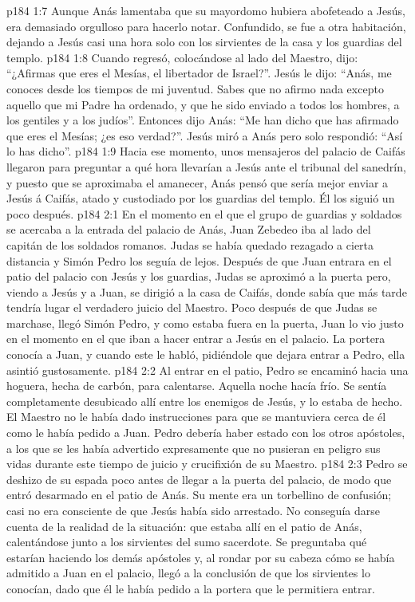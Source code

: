 \vs p184 1:7 Aunque Anás lamentaba que su mayordomo hubiera abofeteado a Jesús, era demasiado orgulloso para hacerlo notar. Confundido, se fue a otra habitación, dejando a Jesús casi una hora solo con los sirvientes de la casa y los guardias del templo.
\vs p184 1:8 Cuando regresó, colocándose al lado del Maestro, dijo: “¿Afirmas que eres el Mesías, el libertador de Israel?”. Jesús le dijo: “Anás, me conoces desde los tiempos de mi juventud. Sabes que no afirmo nada excepto aquello que mi Padre ha ordenado, y que he sido enviado a todos los hombres, a los gentiles y a los judíos”. Entonces dijo Anás: “Me han dicho que has afirmado que eres el Mesías; ¿es eso verdad?”. Jesús miró a Anás pero solo respondió: “Así lo has dicho”.
\vs p184 1:9 Hacia ese momento, unos mensajeros del palacio de Caifás llegaron para preguntar a qué hora llevarían a Jesús ante el tribunal del sanedrín, y puesto que se aproximaba el amanecer, Anás pensó que sería mejor enviar a Jesús á Caifás, atado y custodiado por los guardias del templo. Él los siguió un poco después.
\vs p184 2:1 En el momento en el que el grupo de guardias y soldados se acercaba a la entrada del palacio de Anás, Juan Zebedeo iba al lado del capitán de los soldados romanos. Judas se había quedado rezagado a cierta distancia y Simón Pedro los seguía de lejos. Después de que Juan entrara en el patio del palacio con Jesús y los guardias, Judas se aproximó a la puerta pero, viendo a Jesús y a Juan, se dirigió a la casa de Caifás, donde sabía que más tarde tendría lugar el verdadero juicio del Maestro. Poco después de que Judas se marchase, llegó Simón Pedro, y como estaba fuera en la puerta, Juan lo vio justo en el momento en el que iban a hacer entrar a Jesús en el palacio. La portera conocía a Juan, y cuando este le habló, pidiéndole que dejara entrar a Pedro, ella asintió gustosamente.
\vs p184 2:2 Al entrar en el patio, Pedro se encaminó hacia una hoguera, hecha de carbón, para calentarse. Aquella noche hacía frío. Se sentía completamente desubicado allí entre los enemigos de Jesús, y lo estaba de hecho. El Maestro no le había dado instrucciones para que se mantuviera cerca de él como le había pedido a Juan. Pedro debería haber estado con los otros apóstoles, a los que se les había advertido expresamente que no pusieran en peligro sus vidas durante este tiempo de juicio y crucifixión de su Maestro.
\vs p184 2:3 Pedro se deshizo de su espada poco antes de llegar a la puerta del palacio, de modo que entró desarmado en el patio de Anás. Su mente era un torbellino de confusión; casi no era consciente de que Jesús había sido arrestado. No conseguía darse cuenta de la realidad de la situación: que estaba allí en el patio de Anás, calentándose junto a los sirvientes del sumo sacerdote. Se preguntaba qué estarían haciendo los demás apóstoles y, al rondar por su cabeza cómo se había admitido a Juan en el palacio, llegó a la conclusión de que los sirvientes lo conocían, dado que él le había pedido a la portera que le permitiera entrar.
